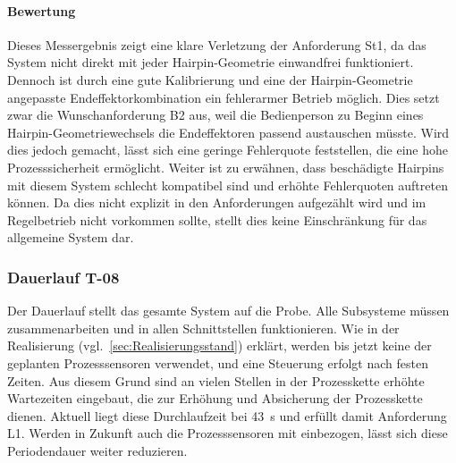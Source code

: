 \paragraph{Bewertung}
Dieses Messergebnis zeigt eine klare Verletzung der Anforderung St1, da das System nicht direkt mit jeder Hairpin-Geometrie einwandfrei
funktioniert. Dennoch ist durch eine gute Kalibrierung und eine der Hairpin-Geometrie angepasste Endeffektorkombination ein
fehlerarmer Betrieb möglich. Dies setzt zwar die Wunschanforderung B2 aus, weil die Bedienperson zu Beginn eines
Hairpin-Geometriewechsels die Endeffektoren passend austauschen müsste. Wird dies jedoch gemacht, lässt sich eine geringe
Fehlerquote feststellen, die eine hohe Prozesssicherheit ermöglicht. Weiter ist zu erwähnen, dass beschädigte Hairpins mit
diesem System schlecht kompatibel sind und erhöhte Fehlerquoten auftreten können. Da dies nicht explizit in den Anforderungen
aufgezählt wird und im Regelbetrieb nicht vorkommen sollte, stellt dies keine Einschränkung für das allgemeine System dar.

\subsubsection{Dauerlauf T-08}\label{sec:VR_Durchsatz}

Der Dauerlauf stellt das gesamte System auf die Probe. Alle Subsysteme müssen zusammenarbeiten und in allen Schnittstellen
funktionieren. Wie in der Realisierung (vgl.\ \cref{sec:Realisierungsstand}) erklärt, werden bis jetzt keine der geplanten
Prozesssensoren verwendet, und eine Steuerung erfolgt nach festen Zeiten. Aus diesem Grund sind an vielen Stellen in der Prozesskette
erhöhte Wartezeiten eingebaut, die zur Erhöhung und Absicherung der Prozesskette dienen. Aktuell liegt diese Durchlaufzeit bei \qty{43}{\second}
und erfüllt damit Anforderung L1. Werden in Zukunft auch die Prozesssensoren mit einbezogen, lässt sich diese Periodendauer weiter
reduzieren.

